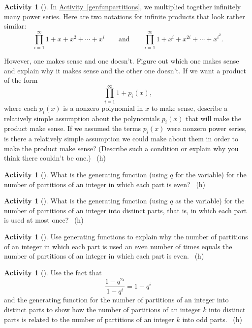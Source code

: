 \documentclass[10pt,]{book}
\theoremstyle{plain}
\theoremstyle{definition}
\theoremstyle{definition}
\theoremstyle{definition}
\newtheorem{activity}[project]{Activity}
\numberwithin{equation}{chapter}
\begin{document}
\begin{activity}[]\label{activity-313}
\hypertarget{p-1591}{}%
In \hyperref[genfunpartitions]{Activity~\ref{genfunpartitions}}, we multiplied together infinitely many power series. Here are two notations for infinite products that look rather similar:%
\begin{equation*}
\prod_{i=1}^\infty 1 + x + x^2 +\cdots+ x^i\qquad\mbox{and}\qquad
\prod_{i=1}^\infty 1 +x^i +x^{2i} +\cdots + x^{i^2}.
\end{equation*}
%
\par
\hypertarget{p-1592}{}%
However, one makes sense and one doesn't. Figure out which one makes sense and explain why it makes sense and the other one doesn't. If we want a product of the form%
\begin{equation*}
\prod_{i=1}^\infty 1 +p_i(x),
\end{equation*}
where each \(p_i(x)\) is a nonzero polynomial in \(x\) to make sense, describe a relatively simple assumption about the polynomials \(p_i(x)\) that will make the product make sense. If we assumed the terms \(p_i(x)\) were nonzero power series, is there a relatively simple assumption we could make about them in order to make the product make sense? (Describe such a condition or explain why you think there couldn't be one.)%
~{\tiny (h)}\end{activity}
\begin{activity}[]\label{activity-314}
\hypertarget{p-1595}{}%
What is the generating function (using \(q\) for the variable) for the number of partitions of an integer in which each part is even?%
~{\tiny (h)}\end{activity}
\begin{activity}[]\label{activity-315}
\hypertarget{p-1598}{}%
What is the generating function (using \(q\) as the variable) for the number of partitions of an integer into distinct parts, that is, in which each part is used at most once?%
~{\tiny (h)}\end{activity}
\begin{activity}[]\label{activity-316}
\hypertarget{p-1601}{}%
Use generating functions to explain why the number of partitions of an integer in which each part is used an even number of times equals the number of partitions of an integer in which each part is even.%
~{\tiny (h)}\end{activity}
\begin{activity}[]\label{activity-317}
\hypertarget{p-1604}{}%
Use the fact that%
\begin{equation*}
\frac{1-q^{2i}}{1-q^i}= 1+q^i
\end{equation*}
and the generating function for the number of partitions of an integer into distinct parts to show how the number of partitions of an integer \(k\) into distinct parts is related to the number of partitions of an integer \(k\) into odd parts.%
~{\tiny (h)}\end{activity}
\end{document}
